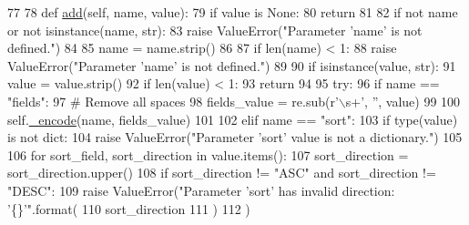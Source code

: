 \begin{DoxyCode}
77 
78     \textcolor{keyword}{def }\hyperlink{classtune_1_1management_1_1service_1_1query__string__builder_1_1QueryStringBuilder_a52936a3c60cbe5dc990ece2561c4d69e}{add}(self, name, value):
79         \textcolor{keywordflow}{if} value \textcolor{keywordflow}{is} \textcolor{keywordtype}{None}:
80             \textcolor{keywordflow}{return}
81 
82         \textcolor{keywordflow}{if} \textcolor{keywordflow}{not} name \textcolor{keywordflow}{or} \textcolor{keywordflow}{not} isinstance(name, str):
83             \textcolor{keywordflow}{raise} ValueError(\textcolor{stringliteral}{"Parameter 'name' is not defined."})
84 
85         name = name.strip()
86 
87         \textcolor{keywordflow}{if} len(name) < 1:
88             \textcolor{keywordflow}{raise} ValueError(\textcolor{stringliteral}{"Parameter 'name' is not defined."})
89 
90         \textcolor{keywordflow}{if} isinstance(value, str):
91             value = value.strip()
92             \textcolor{keywordflow}{if} len(value) < 1:
93                 \textcolor{keywordflow}{return}
94 
95         \textcolor{keywordflow}{try}:
96             \textcolor{keywordflow}{if} name == \textcolor{stringliteral}{"fields"}:
97                 \textcolor{comment}{# Remove all spaces}
98                 fields\_value = re.sub(\textcolor{stringliteral}{r'\(\backslash\)s+'}, \textcolor{stringliteral}{''}, value)
99 
100                 self.\hyperlink{classtune_1_1management_1_1service_1_1query__string__builder_1_1QueryStringBuilder_a0b965e40a56591054bb62d0178bbe8b9}{\_encode}(name, fields\_value)
101 
102             \textcolor{keywordflow}{elif} name == \textcolor{stringliteral}{"sort"}:
103                 \textcolor{keywordflow}{if} type(value) \textcolor{keywordflow}{is} \textcolor{keywordflow}{not} dict:
104                     \textcolor{keywordflow}{raise} ValueError(\textcolor{stringliteral}{"Parameter 'sort' value is not a dictionary."})
105 
106                 \textcolor{keywordflow}{for} sort\_field, sort\_direction \textcolor{keywordflow}{in} value.items():
107                     sort\_direction = sort\_direction.upper()
108                     \textcolor{keywordflow}{if} sort\_direction != \textcolor{stringliteral}{"ASC"} \textcolor{keywordflow}{and} sort\_direction != \textcolor{stringliteral}{"DESC"}:
109                         \textcolor{keywordflow}{raise} ValueError(\textcolor{stringliteral}{"Parameter 'sort' has invalid direction: '\{\}'"}.format(
110                             sort\_direction
111                             )
112                         )

\end{DoxyCode}
